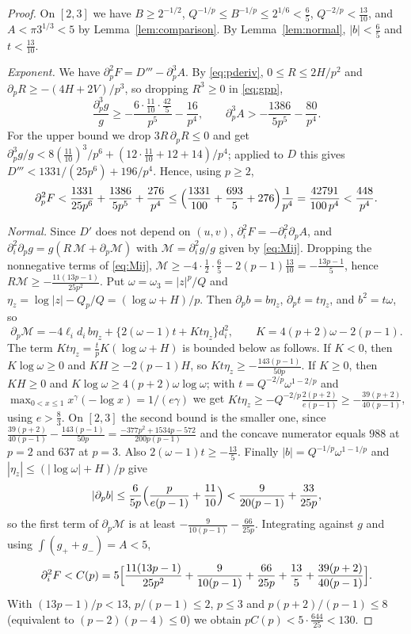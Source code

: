 \documentclass[11pt]{amsart}
\theoremstyle{definition}
\theoremstyle{remark}
\numberwithin{equation}{section}
\begin{document}
\begin{proof}
On $[2,3]$ we have $B\ge2^{-1/2}$, $Q^{-1/p}\le B^{-1/p}\le2^{1/6}<\frac65$, $Q^{-2/p}<\frac{13}{10}$, and $A<\pi3^{1/3}<5$ by Lemma~\ref{lem:comparison}. By Lemma~\ref{lem:normal}, $|b|<\frac65$ and $t<\frac{13}{10}$.

\emph{Exponent.} We have $\partial_p^2F=D'''-\partial_p^3A$. By \eqref{eq:pderiv}, $0\le R\le 2H/p^2$ and $\partial_pR\ge-(4H+2V)/p^3$, so dropping $R^3\ge0$ in \eqref{eq:gpp},
\[
\frac{\partial_p^3g}{g}\ge -\frac{6\cdot\frac{11}{10}\cdot\frac{42}5}{p^5}-\frac{16}{p^4},\qquad \partial_p^3A>-\frac{1386}{5p^5}-\frac{80}{p^4}.
\]
For the upper bound we drop $3R\,\partial_pR\le0$ and get $\partial_p^3g/g<8(\frac{11}{10})^3/p^6+(12\cdot\frac{11}{10}+12+14)/p^4$; applied to $D$ this gives $D'''<1331/(25p^6)+196/p^4$. Hence, using $p\ge2$,
\[
\partial_p^2F<\frac{1331}{25p^6}+\frac{1386}{5p^5}+\frac{276}{p^4}\le\Bigl(\frac{1331}{100}+\frac{693}{5}+276\Bigr)\frac1{p^4}=\frac{42791}{100\,p^4}<\frac{448}{p^4}.
\]

\emph{Normal.} Since $D'$ does not depend on $(u,v)$, $\partial_i^2F=-\partial_i^2\partial_pA$, and $\partial_i^2\partial_pg=g(R\,\mathcal M+\partial_p\mathcal M)$ with $\mathcal M=\partial_i^2g/g$ given by \eqref{eq:Mij}. Dropping the nonnegative terms of \eqref{eq:Mij}, $\mathcal M\ge-4\cdot\frac12\cdot\frac65-2(p-1)\frac{13}{10}=-\frac{13p-1}5$, hence $R\mathcal M\ge-\frac{11(13p-1)}{25p^2}$. Put $\omega=\omega_3=|z|^p/Q$ and $\eta_z=\log|z|-Q_p/Q=(\log\omega+H)/p$. Then $\partial_pb=b\eta_z$, $\partial_pt=t\eta_z$, and $b^2=t\omega$, so
\[
\partial_p\mathcal M=-4\ell_id_i\,b\eta_z+\bigl\{2(\omega-1)t+K t\eta_z\bigr\}d_i^2,\qquad K=4(p+2)\omega-2(p-1).
\]
The term $Kt\eta_z=\frac tpK(\log\omega+H)$ is bounded below as follows. If $K<0$, then $K\log\omega\ge0$ and $KH\ge-2(p-1)H$, so $Kt\eta_z\ge-\frac{143(p-1)}{50p}$. If $K\ge0$, then $KH\ge0$ and $K\log\omega\ge4(p+2)\omega\log\omega$; with $t=Q^{-2/p}\omega^{1-2/p}$ and $\max_{0<x\le1}x^\gamma(-\log x)=1/(e\gamma)$ we get $Kt\eta_z\ge-Q^{-2/p}\frac{2(p+2)}{e(p-1)}\ge-\frac{39(p+2)}{40(p-1)}$, using $e>\frac83$. On $[2,3]$ the second bound is the smaller one, since $\frac{39(p+2)}{40(p-1)}-\frac{143(p-1)}{50p}=\frac{-377p^2+1534p-572}{200p(p-1)}$ and the concave numerator equals $988$ at $p=2$ and $637$ at $p=3$. Also $2(\omega-1)t\ge-\frac{13}5$. Finally $|b|=Q^{-1/p}\omega^{1-1/p}$ and $|\eta_z|\le(|\log\omega|+H)/p$ give
\[
|\partial_pb|\le\frac6{5p}\Bigl(\frac{p}{e(p-1)}+\frac{11}{10}\Bigr)<\frac9{20(p-1)}+\frac{33}{25p},
\]
so the first term of $\partial_p\mathcal M$ is at least $-\frac9{10(p-1)}-\frac{66}{25p}$. Integrating against $g$ and using $\int(g_++g_-)=A<5$,
\[
\partial_i^2F<C(p)=5\Bigl[\frac{11(13p-1)}{25p^2}+\frac9{10(p-1)}+\frac{66}{25p}+\frac{13}5+\frac{39(p+2)}{40(p-1)}\Bigr].
\]
With $(13p-1)/p<13$, $p/(p-1)\le2$, $p\le3$ and $p(p+2)/(p-1)\le8$ (equivalent to $(p-2)(p-4)\le0$) we obtain $pC(p)<5\cdot\frac{644}{25}<130$.


\end{proof}
\end{document}
